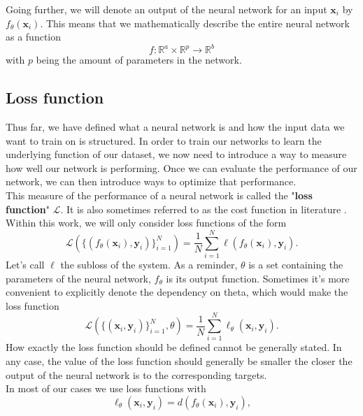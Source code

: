 Going further, we will denote an output of the neural network for an input $\mathbf{x}_i$ by $f_\theta(\mathbf{x}_i)$. This means that we mathematically describe the entire neural network as a function
\begin{equation}
	f: \mathbb{R}^a \times \mathbb{R}^p \rightarrow \mathbb{R}^b
\end{equation}
with $p$ being the amount of parameters in the network.

\subsection{Loss function}
Thus far, we have defined what a neural network is and how the input data we want to train on is structured. In order to train our networks to learn the underlying function of our dataset, we now need to introduce a way to measure how well our network is performing. Once we can evaluate the performance of our network, we can then introduce ways to optimize that performance.\\
This measure of the performance of a neural network is called the "\textbf{loss function}" $\mathscr{L}$. It is also sometimes referred to as the cost function in literature \cite{NGD}. Within this work, we will only consider loss functions of the form 
\begin{equation}
	\mathscr{L}\left( \{(f_\theta(\mathbf{x}_i), \mathbf{y}_i)\}_{i=1}^{N} \right) = \frac{1}{N} \sum_{i=1}^{N} \ell\left(f_\theta(\mathbf{x}_i),\mathbf{y}_i\right).
	\label{eq:Loss_longform_withFunctiondependency}
\end{equation}
Let's call $\ell$ the subloss of the system. As a reminder, $\theta$ is a set containing the parameters of the neural network, $f_\theta$ is its output function. Sometimes it's more convenient to explicitly denote the dependency on theta, which would make the loss function
\begin{equation}\label{eq:Loss_longform}
	\mathscr{L}\left( \{(\mathbf{x}_i, \mathbf{y}_i)\}_{i=1}^{N}, \theta \right) = \frac{1}{N} \sum_{i=1}^{N} \ell_\theta\left(\mathbf{x}_i,\mathbf{y}_i\right).
\end{equation}
How exactly the loss function should be defined cannot be generally stated. In any case, the value of the loss function should generally be smaller the closer the output of the neural network is to the corresponding targets.\\
In most of our cases we use loss functions with 
\begin{equation}\label{eq:DistanceLoss}
	\ell_\theta \left( \mathbf{x}_i,\mathbf{y}_i\right) = 
	d\left(f_\theta(\mathbf{x}_i), \mathbf{y}_i\right),
\end{equation}
